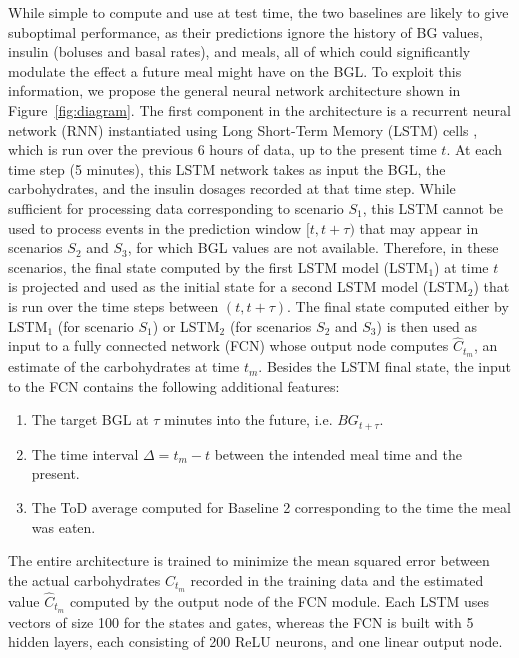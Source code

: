 \documentclass{ecai}
\begin{document}
While simple to compute and use at test time, the two baselines are likely to give suboptimal performance, as their predictions ignore the history of BG values, insulin (boluses and basal rates), and meals, all of which could significantly modulate the effect a future meal might have on the BGL. To exploit this information, we propose the general neural network architecture shown in Figure~\ref{fig:diagram}. The first component in the architecture is a recurrent neural network (RNN) instantiated using Long Short-Term Memory (LSTM) cells \cite{hochreiter:nc97}, which is run over the previous 6 hours of data, up to the present time $t$. At each time step (5 minutes), this LSTM network takes as input the BGL, the carbohydrates, and the insulin dosages recorded at that time step. While sufficient for processing data corresponding to scenario $S_1$, this LSTM cannot be used to process events in the prediction window $[t, t + \tau)$ that may appear in scenarios $S_2$ and $S_3$, for which BGL values are not available. Therefore, in these scenarios, the final state computed by the first LSTM model (LSTM$_1$) at time $t$ is projected and used as the initial state for a second LSTM model (LSTM$_2$) that is run over the time steps between $(t, t+\tau)$. The final state computed either by LSTM$_1$ (for scenario $S_{1}$) or LSTM$_2$ (for scenarios $S_2$ and $S_3$) is then used as input to a fully connected network (FCN) whose output node computes $\hat{C}_{t_m}$, an estimate of the carbohydrates at time $t_m$. Besides the LSTM final state, the input to the FCN contains the following additional features: 
\begin{enumerate}
    \item The target BGL at $\tau$ minutes into the future, i.e. $BG_{t + \tau}$.
    \item The time interval $\Delta = t_m - t$ between the intended meal time and the present.
    \item The ToD average computed for Baseline 2 corresponding to the time the meal was eaten. 
\end{enumerate}
The entire architecture is trained to minimize the mean squared error between the actual carbohydrates $C_{t_m}$ recorded in the training data and the estimated value $\hat{C}_{t_m}$ computed by the output node of the FCN module. Each LSTM uses vectors of size 100 for the states and gates, whereas the FCN is built with 5 hidden layers, each consisting of 200 ReLU neurons, and one linear output node.

\end{document}
